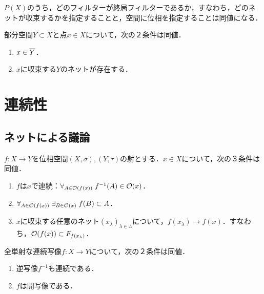 \documentclass[uplatex,dvipdfmx]{jsreport}
\begin{document}
\begin{tcolorbox}[colframe=ForestGreen, colback=ForestGreen!10!white,breakable,colbacktitle=ForestGreen!40!white,coltitle=black,fonttitle=\bfseries\sffamily,
title=]
    $P(X)$のうち，どのフィルターが終局フィルターであるか，すなわち，どのネットが収束するかを指定することと，空間に位相を指定することは同値になる．
\end{tcolorbox}

\begin{proposition}[(AC)]
    部分空間$Y\subset X$と点$x\in X$について，次の２条件は同値．
    \begin{enumerate}
        \item $x\in\overline{Y}$．
        \item $x$に収束する$Y$のネットが存在する．
    \end{enumerate}
\end{proposition}

\section{連続性}

\subsection{ネットによる議論}

\begin{proposition}[連続性の特徴付け]\label{prop-characterization-of-continuousness}
    $f:X\to Y$を位相空間$(X,\sigma),(Y,\tau)$の射とする．$x\in X$について，次の３条件は同値．
    \begin{enumerate}
        \item $f$は$x$で連続：$\forall_{A\in\mathcal{O}(f(x))}\;f^{-1}(A)\in\mathcal{O}(x)$．
        \item $\forall_{A\in\mathcal{O}(f(x))}\;\exists_{B\in\mathcal{O}(x)}\;f(B)\subset A$．
        \item $x$に収束する任意のネット$(x_\lambda)_{\lambda\in\Lambda}$について，$f(x_\lambda)\to f(x)$．すなわち，$\mathcal{O}(f(x))\subset F_{f(x_\lambda)}$．
    \end{enumerate}
\end{proposition}

\begin{proposition}[位相同型の特徴付け]
    全単射な連続写像$f:X\to Y$について，次の２条件は同値．
    \begin{enumerate}
        \item 逆写像$f^{-1}$も連続である．
        \item $f$は開写像である．
    \end{enumerate}
\end{proposition}
\end{document}
